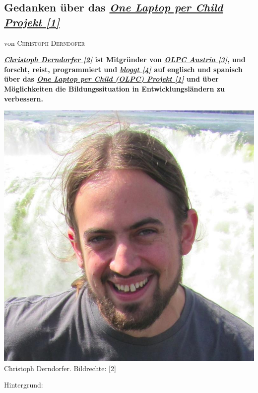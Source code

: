 \documentclass[10pt,a4paper,ngerman,twoside]{article} %
\newcommand{\NewsItem}[1]{ %
\usefont{T1}{fvs}{n}{n} %
\vspace{24pt}\large #1\vspace{3pt} %
\par \normalsize \normalfont}
\newcommand{\NewsAuthor}[1]{ %
\hfill von \textsc{#1} \vspace{20pt} %
\par \normalfont}
\begin{document}
\begin{multicols}{3}
\NewsItem{}
\section*{Gedanken über das \href{http://one.laptop.org/}{\textit{One Laptop per Child Projekt [1]}}}
\label{olpcnewyear}
\NewsAuthor{Christoph Derndofer}

\textbf{\href{http://christoph-d.blogspot.co.at/}{\textit{Christoph Derndorfer [2]}} ist Mitgründer von \href{http://olpc.at/?setlang=de}{\textit{OLPC Austria [3]}}, und forscht, reist, programmiert und \href{http://www.olpcnews.com/}{\textit{bloggt [4]}} auf englisch und spanisch über das \href{http://one.laptop.org/}{\textit{One Laptop per Child (OLPC) Projekt [1]}} und über Möglichkeiten die Bildungssituation in Entwicklungsländern zu verbessern.} \\

\begin{center}
\includegraphics[width=\linewidth]{olpcnewyear/olpc-christoph.jpg} \\
\footnotesize{Christoph Derndorfer. Bildrechte: [2]}
\end{center}

Hintergrund: \\


\end{multicols}
\end{document}
